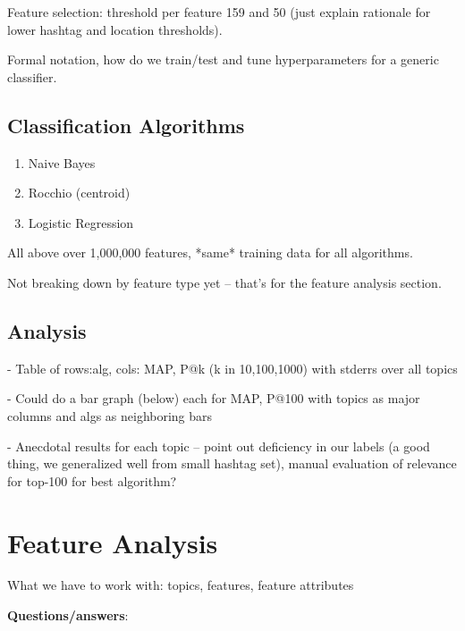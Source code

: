 \documentclass[letterpaper]{article}
\begin{document}
Feature selection: threshold per feature 159 and 50 (just explain rationale for lower hashtag and location thresholds).

Formal notation, how do we train/test and tune hyperparameters for a generic classifier.

\subsection{Classification Algorithms}

\begin{enumerate}
\item Naive Bayes
\item Rocchio (centroid)
\item Logistic Regression
\end{enumerate}

All above over 1,000,000 features, *same* training data for all algorithms.

Not breaking down by feature type yet -- that's for the feature analysis section.

\subsection{Analysis}

- Table of rows:alg, cols: MAP, P@k (k in {10,100,1000}) with stderrs over all topics

- Could do a bar graph (below) each for MAP, P@100 with topics as major columns and algs as neighboring bars

- Anecdotal results for each topic -- point out deficiency in our labels (a good thing, we generalized well from small hashtag set), manual evaluation of relevance for top-100 for best algorithm?


\section{Feature Analysis}

What we have to work with: topics, features, feature attributes

\noindent \textbf{Questions/answers}:
\end{document}
